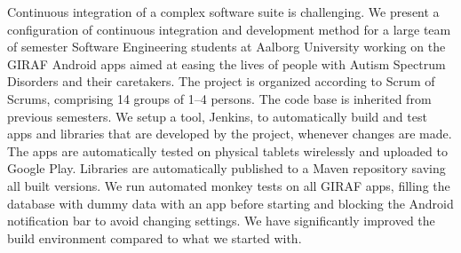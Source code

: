 Continuous integration of a complex software suite is challenging. We present a configuration of continuous integration and development method for a large team of  semester Software Engineering students at Aalborg University working on the GIRAF Android apps aimed at easing the lives of people with Autism Spectrum Disorders and their caretakers. The project is organized according to Scrum of Scrums, comprising 14 groups of 1--4 persons. The code base is inherited from previous semesters. We setup a tool, Jenkins, to automatically build and test apps and libraries that are developed by the project, whenever changes are made. The apps are automatically tested on physical tablets wirelessly and uploaded to Google Play. Libraries are automatically published to a Maven repository saving all built versions. We run automated monkey tests on all GIRAF apps, filling the database with dummy data with an app before starting and blocking the Android notification bar to avoid changing settings. We have significantly improved the build environment compared to what we started with.